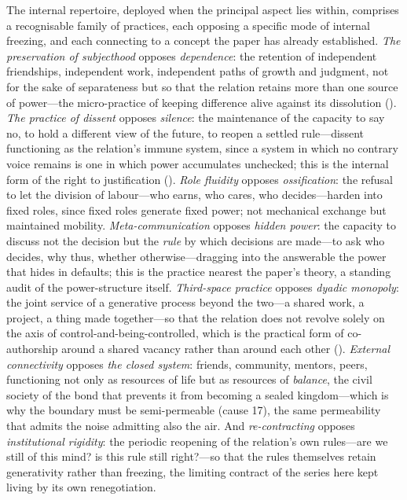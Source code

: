 \noindent
The internal repertoire, deployed when the principal aspect lies within, comprises a recognisable family of practices, each opposing a specific mode of internal freezing, and each connecting to a concept the paper has already established. \emph{The preservation of subjecthood} opposes \emph{dependence}: the retention of independent friendships, independent work, independent paths of growth and judgment, not for the sake of separateness but so that the relation retains more than one source of power---the micro-practice of keeping difference alive against its dissolution (). \emph{The practice of dissent} opposes \emph{silence}: the maintenance of the capacity to say no, to hold a different view of the future, to reopen a settled rule---dissent functioning as the relation's immune system, since a system in which no contrary voice remains is one in which power accumulates unchecked; this is the internal form of the right to justification (). \emph{Role fluidity} opposes \emph{ossification}: the refusal to let the division of labour---who earns, who cares, who decides---harden into fixed roles, since fixed roles generate fixed power; not mechanical exchange but maintained mobility. \emph{Meta-communication} opposes \emph{hidden power}: the capacity to discuss not the decision but the \emph{rule} by which decisions are made---to ask who decides, why thus, whether otherwise---dragging into the answerable the power that hides in defaults; this is the practice nearest the paper's theory, a standing audit of the power-structure itself. \emph{Third-space practice} opposes \emph{dyadic monopoly}: the joint service of a generative process beyond the two---a shared work, a project, a thing made together---so that the relation does not revolve solely on the axis of control-and-being-controlled, which is the practical form of co-authorship around a shared vacancy rather than around each other (). \emph{External connectivity} opposes \emph{the closed system}: friends, community, mentors, peers, functioning not only as resources of life but as resources of \emph{balance}, the civil society of the bond that prevents it from becoming a sealed kingdom---which is why the boundary must be semi-permeable (cause 17), the same permeability that admits the noise admitting also the air. And \emph{re-contracting} opposes \emph{institutional rigidity}: the periodic reopening of the relation's own rules---are we still of this mind? is this rule still right?---so that the rules themselves retain generativity rather than freezing, the limiting contract of the series here kept living by its own renegotiation.

